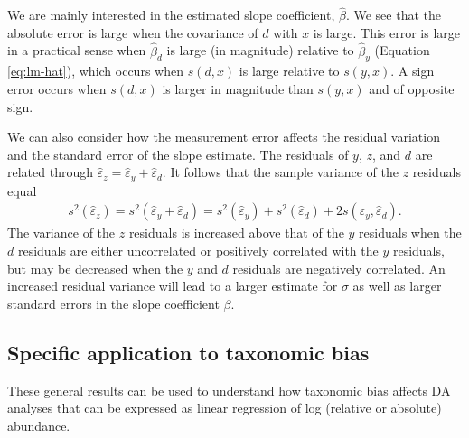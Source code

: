\documentclass[
]{article}
\begin{document}
We are mainly interested in the estimated slope coefficient, \(\hat \beta\).
We see that the absolute error is large when the covariance of \(d\) with \(x\) is large.
This error is large in a practical sense when \(\hat \beta_{d}\) is large (in magnitude) relative to \(\hat \beta_y\) (Equation \eqref{eq:lm-hat}), which occurs when \(s(d,x)\) is large relative to \(s(y,x)\).
A sign error occurs when \(s(d,x)\) is larger in magnitude than \(s(y,x)\) and of opposite sign.

We can also consider how the measurement error affects the residual variation and the standard error of the slope estimate.
The residuals of \(y\), \(z\), and \(d\) are related through \(\hat \varepsilon_z = \hat \varepsilon_y + \hat \varepsilon_d\).
It follows that the sample variance of the \(z\) residuals equal
\begin{align}
  s^2(\hat \varepsilon_{z}) 
  = s^2(\hat \varepsilon_y + \hat \varepsilon_{d})
  = s^2(\hat \varepsilon_y) + s^2(\hat \varepsilon_{d}) + 2 s(\hat \varepsilon_y, \hat \varepsilon_{d}).
\end{align}
The variance of the \(z\) residuals is increased above that of the \(y\) residuals when the \(d\) residuals are either uncorrelated or positively correlated with the \(y\) residuals, but may be decreased when the \(y\) and \(d\) residuals are negatively correlated.
An increased residual variance will lead to a larger estimate for \(\sigma\) as well as larger standard errors in the slope coefficient \(\beta\).

\hypertarget{specific-application-to-taxonomic-bias}{%
\subsection{Specific application to taxonomic bias}\label{specific-application-to-taxonomic-bias}}

These general results can be used to understand how taxonomic bias affects DA analyses that can be expressed as linear regression of log (relative or absolute) abundance.
\end{document}
